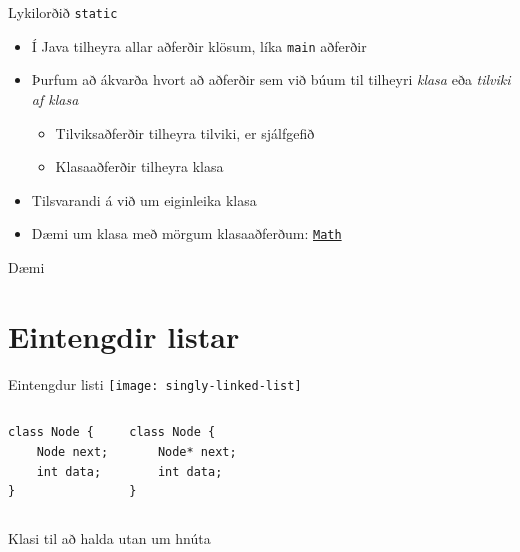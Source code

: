 \documentclass[handout]{beamer}
\begin{document}
\begin{frame}{Lykilorðið \texttt{static}}
	\begin{itemize}
		\item Í Java tilheyra allar aðferðir klösum, líka \texttt{main} aðferðir
		\item Þurfum að ákvarða hvort að aðferðir sem við búum til tilheyri \emph{klasa} eða \emph{tilviki af klasa}
		      \begin{itemize}
			      \item Tilviksaðferðir  tilheyra tilviki, er sjálfgefið
			      \item Klasaaðferðir  tilheyra klasa
		      \end{itemize}
		\item Tilsvarandi á við um eiginleika klasa 
		\item Dæmi um klasa með mörgum klasaaðferðum: \href{https://docs.oracle.com/javase/8/docs/api/java/lang/Math.html}{\texttt{Math}}
	\end{itemize}
\end{frame}

\begin{frame}{Dæmi}
\end{frame}

\section{Eintengdir listar}

\begin{frame}[fragile]{Eintengdur listi}
	\texttt{[image: singly-linked-list]}

	\begin{columns}
		\begin{verbatim}
class Node {
    Node next;
    int data;
}
		\end{verbatim}
		\begin{verbatim}
class Node {
    Node* next;
    int data;
}
\end{verbatim}

	\end{columns}
\end{frame}

\begin{frame}[fragile]{Klasi til að halda utan um hnúta}
\end{frame}
\end{document}
